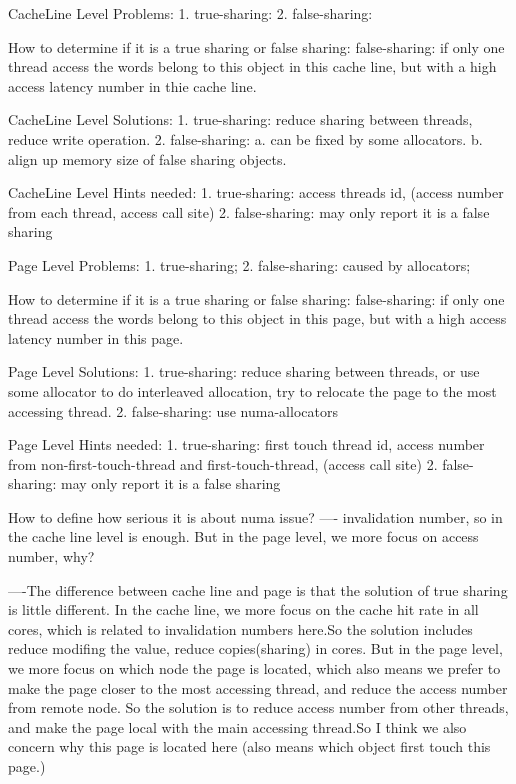 CacheLine Level Problems:
        1. true-sharing:
        2. false-sharing:

How to determine if it is a true sharing or false sharing:
        false-sharing: if only one thread access the words belong to this object in this cache line,
but with a high access latency number in thie cache line.

CacheLine Level Solutions:
        1. true-sharing: reduce sharing between threads, reduce write operation.
        2. false-sharing:
                        a. can be fixed by some allocators.
                        b. align up memory size of false sharing objects.

CacheLine Level Hints needed:
        1. true-sharing: access threads id, (access number from each thread, access call site)
        2. false-sharing: may only report it is a false sharing





Page Level Problems:
        1. true-sharing;
        2. false-sharing: caused by allocators;

How to determine if it is a true sharing or false sharing:
        false-sharing: if only one thread access the words belong to this object in this page,
but with a high access latency number in this page.

Page Level Solutions:
        1. true-sharing: reduce sharing between threads, or use some allocator to do interleaved allocation,
                         try to relocate the page to the most accessing thread.
        2. false-sharing: use numa-allocators

Page Level Hints needed:
        1. true-sharing: first touch thread id, access number from non-first-touch-thread and first-touch-thread, (access call site)
        2. false-sharing: may only report it is a false sharing



How to define how serious it is about numa issue? ---- invalidation number, so in the cache line level is enough.
But in the page level, we more focus on access number, why?

----The difference between cache line and page is that the solution of true sharing is little different. In the cache line, we more
focus on the cache hit rate in all cores, which is related to invalidation numbers here.So the solution includes reduce modifing
the value, reduce copies(sharing) in cores.
But in the page level, we more focus on which node the page is located, which also means we prefer to make the page closer to the
most accessing thread, and reduce the access number from remote node. So the solution is to reduce access number from other threads,
and make the page local with the main accessing thread.So I think we also concern why this page is located here (also means which
object first touch this page.)



